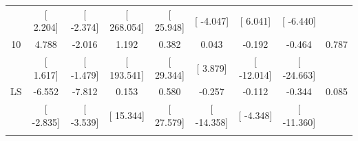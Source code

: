 \documentclass[16pt]{article}
\begin{document}
\begin{table}[!htbp]
\begin{tabular}{@{\extracolsep{5pt}} ccccccccc}
 & [ 2.204] & [ -2.374] & [ 268.054] & [ 25.948] & [ -4.047] & [ 6.041] & [ -6.440] &  \\ 
10 & 4.788 & -2.016 & 1.192 & 0.382 & 0.043 & -0.192 & -0.464 & 0.787 \\ 
 & [ 1.617] & [ -1.479] & [ 193.541] & [ 29.344] & [ 3.879] & [ -12.014] & [ -24.663] &  \\ 
LS & -6.552 & -7.812 & 0.153 & 0.580 & -0.257 & -0.112 & -0.344 & 0.085 \\ 
 & [ -2.835] & [ -3.539] & [ 15.344] & [ 27.579] & [ -14.358] & [ -4.348] & [ -11.360] &  \\ 
\hline \\[-1.8ex] 
\end{tabular} 
\end{table}


\end{document}
